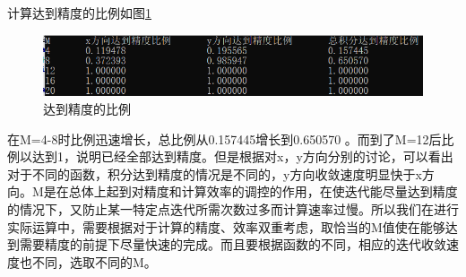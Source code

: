 \documentclass{article}
\begin{document}
	
	计算达到精度的比例如图\ref{fig:2}
	\begin{figure}[!h]
		
		\centering
		\includegraphics[scale=1.0]{error}
		\caption{\heiti{}达到精度的比例}
		\label{fig:2}
	\end{figure}
在M=4-8时比例迅速增长，总比例从0.157445增长到0.650570 。而到了M=12后比例以达到1，说明已经全部达到精度。但是根据对x，y方向分别的讨论，可以看出对于不同的函数，积分达到精度的情况是不同的，y方向收敛速度明显快于x方向。M是在总体上起到对精度和计算效率的调控的作用，在使迭代能尽量达到精度的情况下，又防止某一特定点迭代所需次数过多而计算速率过慢。所以我们在进行实际运算中，需要根据对于计算的精度、效率双重考虑，取恰当的M值使在能够达到需要精度的前提下尽量快速的完成。而且要根据函数的不同，相应的迭代收敛速度也不同，选取不同的M。
\end{document}

